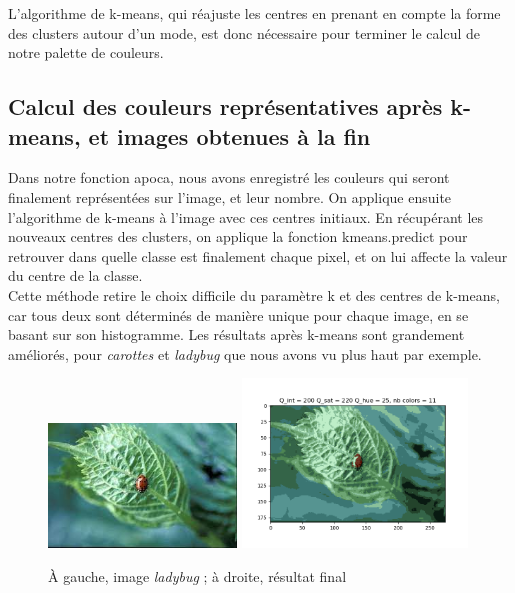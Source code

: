 \documentclass{article}
\begin{document}
L'algorithme de k-means, qui réajuste les centres en prenant en compte la forme des clusters autour d'un mode, est donc nécessaire pour terminer le calcul de notre palette de couleurs.\\

\subsection{Calcul des couleurs représentatives après k-means, et images obtenues à la fin}

Dans notre fonction apoca, nous avons enregistré les couleurs qui seront finalement représentées sur l'image, et leur nombre. On applique ensuite l'algorithme de k-means à l'image avec ces centres initiaux. En récupérant les nouveaux centres des clusters, on applique la fonction kmeans.predict pour retrouver dans quelle classe est finalement chaque pixel, et on lui affecte la valeur du centre de la classe.\\

Cette méthode retire le choix difficile du paramètre k et des centres de k-means, car tous deux sont déterminés de manière unique pour chaque image, en se basant sur son histogramme. Les résultats après k-means sont grandement améliorés, pour {\it carottes} et {\it ladybug} que nous avons vu plus haut par exemple. \\

\begin{figure}[h]
    \centering
    \includegraphics[width=5cm]{ladybug_example.jpeg}
    \includegraphics[width=6cm]{fig8.png}
    \caption{À gauche, image {\it ladybug} ; à droite, résultat final}
\end{figure}
\end{document}
